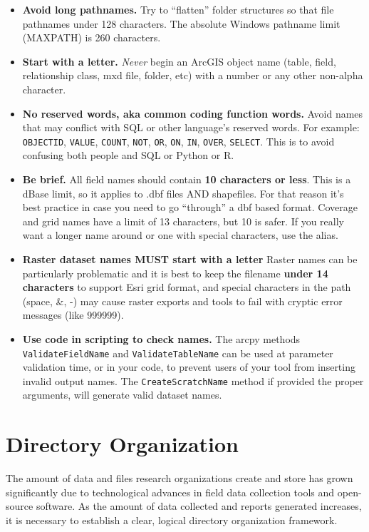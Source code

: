 \documentclass[
]{book}
\begin{document}
\begin{itemize}
\item
  \textbf{Avoid long pathnames.}
  Try to ``flatten'' folder structures so that file pathnames under 128 characters. The absolute Windows pathname limit (MAXPATH) is 260 characters.
\item
  \textbf{Start with a letter.}
  \emph{Never} begin an ArcGIS object name (table, field, relationship class, mxd file, folder, etc) with a number or any other non-alpha character.
\item
  \textbf{No reserved words, aka common coding function words.}
  Avoid names that may conflict with SQL or other language's reserved words. For example: \texttt{OBJECTID}, \texttt{VALUE}, \texttt{COUNT}, \texttt{NOT}, \texttt{OR}, \texttt{ON}, \texttt{IN}, \texttt{OVER}, \texttt{SELECT}. This is to avoid confusing both people and SQL or Python or R.
\item
  \textbf{Be brief.}
  All field names should contain \textbf{10 characters or less}. This is a dBase limit, so it applies to .dbf files AND shapefiles. For that reason it's best practice in case you need to go ``through'' a dbf based format. Coverage and grid names have a limit of 13 characters, but 10 is safer. If you really want a longer name around or one with special characters, use the alias.
\item
  \textbf{Raster dataset names MUST start with a letter}
  Raster names can be particularly problematic and it is best to keep the filename \textbf{under 14 characters} to support Esri grid format, and special characters in the path (space, \&, -) may cause raster exports and tools to fail with cryptic error messages (like 999999).
\item
  \textbf{Use code in scripting to check names.}
  The arcpy methods \texttt{ValidateFieldName} and \texttt{ValidateTableName} can be used at parameter validation time, or in your code, to prevent users of your tool from inserting invalid output names. The \texttt{CreateScratchName} method if provided the proper arguments, will generate valid dataset names.
\end{itemize}

\hypertarget{directory-organization}{%
\section{Directory Organization}\label{directory-organization}}

The amount of data and files research organizations create and store has grown significantly due to technological advances in field data collection tools and open-source software. As the amount of data collected and reports generated increases, it is necessary to establish a clear, logical directory organization framework.
\end{document}
